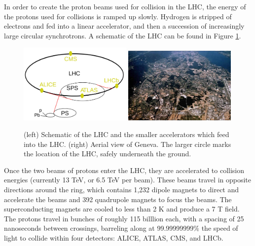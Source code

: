 In order to create the proton beams used for collision in the LHC, the energy of the protons used for collisions is ramped up slowly. Hydrogen is stripped of electrons and fed into a linear accelerator, and then a succession of increasingly large circular synchrotrons. A schematic of the LHC can be found in Figure \ref{Fig:Detect:LHC}.
\begin{figure}[h!]
    \centering
        \includegraphics[width=0.49\textwidth]{F3/LHC}
        \includegraphics[width=0.49\textwidth]{F3/LHC2}
        \caption{(left) Schematic of the LHC and the smaller accelerators which feed into the LHC. (right) Aerial view of Geneva. The larger circle marks the location of the LHC, safely underneath the ground.}
        \label{Fig:Detect:LHC}
\end{figure}
Once the two beams of protons enter the LHC, they are accelerated to collision energies (currently 13 TeV, or 6.5 TeV per beam). These beams travel in opposite directions around the ring, which contains 1,232 dipole magnets to direct and accelerate the beams and 392 quadrupole magnets to focus the beams. The superconducting magnets are cooled to less than 2 K and produce a 7 T field. The protons travel in bunches of roughly 115 billlion each, with a spacing of 25 nanoseconds between crossings, barreling along at 99.99999999$\%$ the speed of light to collide within four detectors: ALICE, ATLAS, CMS, and LHCb.

